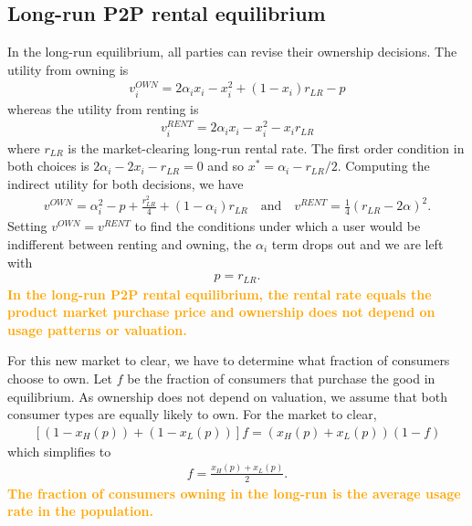 \documentclass[11pt]{article}
\newtheorem{prop}{Proposition}
\newcommand{\important}[1]{\textcolor{orange}{\textbf{#1}}}
\begin{document}


\subsection{Long-run P2P rental equilibrium} 
In the long-run equilibrium, all parties can revise their ownership decisions. 
The utility from owning is 
\begin{align}
v^{OWN}_i = 2\alpha_i x_i - x_i^2 + (1-x_i)r_{LR} - p   
\end{align} 
whereas the utility from renting is 
\begin{align}
v^{RENT}_{i} = 2\alpha_i x_i - x_i^2 - x_i r_{LR}  
\end{align} 
where $r_{LR}$ is the market-clearing long-run rental rate. 
The first order condition in both choices is $2 \alpha_i - 2 x_i - r_{LR} = 0$ and so $x^* = \alpha_i - r_{LR}/2$. 
Computing the indirect utility for both decisions, we have
\begin{align} 
v^{OWN} = \alpha_i^2 - p + \frac{r_{LR}^2}{4} + (1 - \alpha_i) r_{LR} \quad  \mbox{and} \quad v^{RENT} = \frac{1}{4} (r_{LR}- 2\alpha )^2. 
\end{align} 
Setting $v^{OWN} = v^{RENT}$ to find the conditions under which a user would be indifferent between renting and owning, the $\alpha_i$ term drops out and we are left with 
\begin{align}
p = r_{LR}. 
\end{align}
 \important{In the long-run P2P rental equilibrium, the rental rate equals the product market purchase price and ownership does not depend on usage patterns or valuation.}  

For this new market to clear, we have to determine what fraction of consumers choose to own. 
Let $f$ be the fraction of consumers that purchase the good in equilibrium. 
As ownership does not depend on valuation, we assume that both consumer types are equally likely to own. 
For the market to clear, 
\begin{align}
\left[ (1-x_H(p)) + (1-x_L(p))\right]f = \left(x_H(p) + x_L(p) \right)(1- f) 
\end{align} 
which simplifies to 
\begin{align}
f = \frac{x_H(p) + x_L(p)}{2}.  
\end{align} 
\important{The fraction of consumers owning in the long-run is the average usage rate in the population.}  
\end{document}
